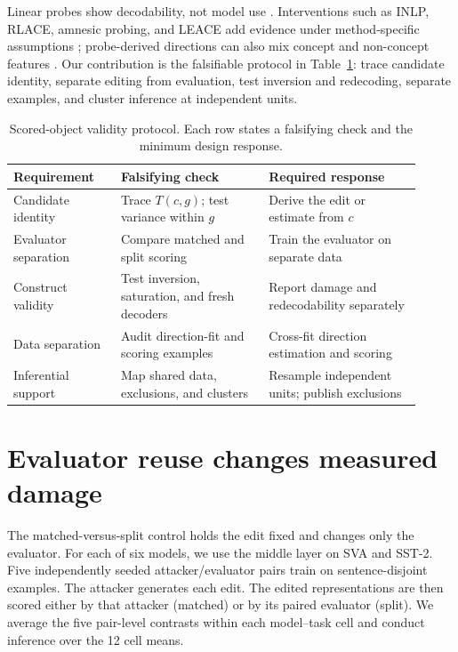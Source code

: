 \documentclass{article}
\newcommand{\SplitCells}{12}
\begin{document}
Linear probes show decodability, not model use \citep{alain2017understanding,hewitt2019designing,belinkov2022probing}. Interventions such as INLP, RLACE, amnesic probing, and LEACE add evidence under method-specific assumptions \citep{ravfogel2020null,ravfogel2022linear,elazar2021amnesic,belrose2023leace}; probe-derived directions can also mix concept and non-concept features \citep{kumar2022unreliable}. Our contribution is the falsifiable protocol in Table~\ref{tab:protocol}: trace candidate identity, separate editing from evaluation, test inversion and redecoding, separate examples, and cluster inference at independent units.

\begin{table}[t]
\centering
\small
\setlength{\tabcolsep}{4pt}
\begin{tabular}{p{0.24\linewidth}p{0.33\linewidth}p{0.34\linewidth}}
\toprule
Requirement & Falsifying check & Required response \\
\midrule
Candidate identity & Trace $T(c,g)$; test variance within $g$ & Derive the edit or estimate from $c$ \\
Evaluator separation & Compare matched and split scoring & Train the evaluator on separate data \\
Construct validity & Test inversion, saturation, and fresh decoders & Report damage and redecodability separately \\
Data separation & Audit direction-fit and scoring examples & Cross-fit direction estimation and scoring \\
Inferential support & Map shared data, exclusions, and clusters & Resample independent units; publish exclusions \\
\bottomrule
\end{tabular}
\caption{Scored-object validity protocol. Each row states a falsifying check and the minimum design response.}
\label{tab:protocol}
\end{table}

\section{Evaluator reuse changes measured damage}
\label{sec:split}

The matched-versus-split control holds the edit fixed and changes only the evaluator. For each of six models, we use the middle layer on SVA and SST-2. Five independently seeded attacker/evaluator pairs train on sentence-disjoint examples. The attacker generates each edit. The edited representations are then scored either by that attacker (matched) or by its paired evaluator (split). We average the five pair-level contrasts within each model--task cell and conduct inference over the \SplitCells{} cell means.
\end{document}
